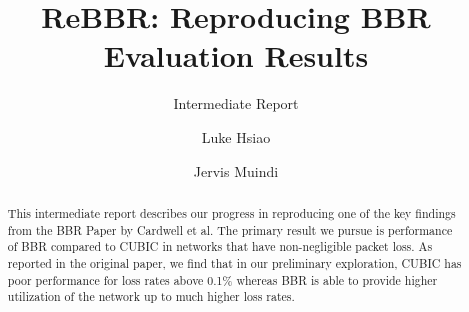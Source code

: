 \documentclass[sigconf]{acmart}
\begin{document}
\title{ReBBR: Reproducing BBR Evaluation Results}
\subtitle{Intermediate Report}

\author{Luke Hsiao}

\author{Jervis Muindi}


\begin{abstract}
This intermediate report describes our progress in reproducing one of the key
findings from the BBR Paper by Cardwell et al. The primary
result we pursue is performance of BBR compared to CUBIC in
networks that have non-negligible packet loss. As reported
in the original paper, we find that in our preliminary exploration,
CUBIC has poor performance for loss rates above 0.1\% whereas BBR is able
to provide higher utilization of the network up to much higher loss rates.
\baselineskip
\end{abstract}





\maketitle





\balance



\end{document}
